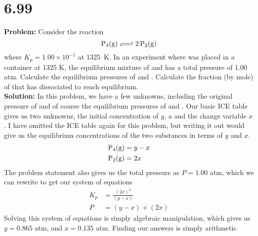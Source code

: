 \documentclass[11 pt]{article}
\begin{document}
\section*{6.99}
\textbf{Problem:} Consider the reaction $$\ce{P4(g) <=> 2P2(g)}$$ where $K_p = 1.00 \times 10^{-1}$ at \SI{1325}{\kelvin}.
In an experiment where  was placed in a container at 1325 K,  the equilibrium mixture of  and 
has a total pressure of 1.00 atm. Calculate the equilibrium pressures of  and . Calculate the fraction (by mole) of 
that has dissociated to reach equilibrium. \\

\textbf{Solution:} In this problem, we have a few unknowns, including the original 
pressure of  and of course the equilibrium pressures of  and .
Our basic ICE table gives us two unknowns, the initial concentration of  $y$, a
and the change variable $x$. I have omitted the ICE table again for this problem, but writing it out
would give us the equilibrium concentrations of the two substances in terms of $y$ and $x$. 
\begin{align*}
  \ce{P4(g)} &= y - x \\
  \ce{P2(g)} &= 2x 
\end{align*}
The problem statement also gives us the total pressure as $P = 1.00$ atm, which we can rewrite to get our system of equations
\begin{align}
  K_p &= \frac{(2x)^2}{(y-x)} \\
  P &= (y-x) + (2x)
\end{align}
Solving this system of equations is simply algebraic manipulation, which gives us
$y = 0.865$ atm, and $x = 0.135$ atm. Finding our answers is simply arithmetic.
\end{document}
